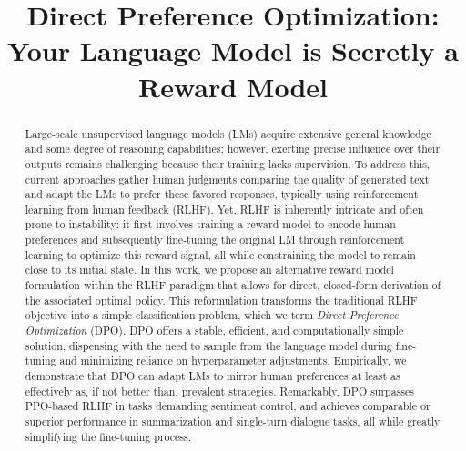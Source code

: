 \title{Direct Preference Optimization: Your Language Model is Secretly a Reward Model}

\begin{abstract}
Large-scale unsupervised language models (LMs) acquire extensive general knowledge and some degree of reasoning capabilities; however, exerting precise influence over their outputs remains challenging because their training lacks supervision. To address this, current approaches gather human judgments comparing the quality of generated text and adapt the LMs to prefer these favored responses, typically using reinforcement learning from human feedback (RLHF). Yet, RLHF is inherently intricate and often prone to instability: it first involves training a reward model to encode human preferences and subsequently fine-tuning the original LM through reinforcement learning to optimize this reward signal, all while constraining the model to remain close to its initial state. In this work, we propose an alternative reward model formulation within the RLHF paradigm that allows for direct, closed-form derivation of the associated optimal policy. This reformulation transforms the traditional RLHF objective into a simple classification problem, which we term \textit{Direct Preference Optimization} (DPO). DPO offers a stable, efficient, and computationally simple solution, dispensing with the need to sample from the language model during fine-tuning and minimizing reliance on hyperparameter adjustments. Empirically, we demonstrate that DPO can adapt LMs to mirror human preferences at least as effectively as, if not better than, prevalent strategies. Remarkably, DPO surpasses PPO-based RLHF in tasks demanding sentiment control, and achieves comparable or superior performance in summarization and single-turn dialogue tasks, all while greatly simplifying the fine-tuning process.
\end{abstract}

